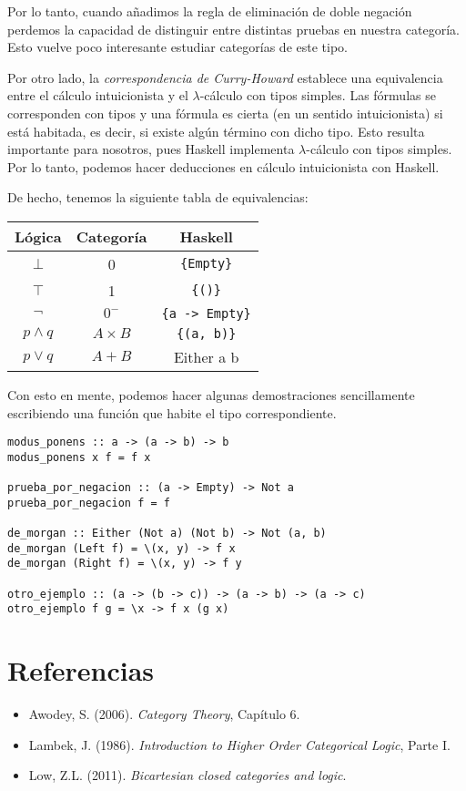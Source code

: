 \documentclass[12pt, twoside]{book}
\newcommand{\newterm}[1]{\index{#1}\emph{#1}}
\newcommand{\code}[1]{\Verb+{#1}+}
\begin{document}
Por lo tanto, cuando añadimos la regla de eliminación de doble negación perdemos la capacidad de distinguir entre distintas pruebas en nuestra categoría.
Esto vuelve poco interesante estudiar categorías de este tipo. 

Por otro lado, la \newterm{correspondencia de Curry-Howard} establece una equivalencia entre el cálculo intuicionista y el $\lambda$-cálculo con tipos simples.
Las fórmulas se corresponden con tipos y una fórmula es cierta (en un sentido intuicionista) si está habitada, es decir, si existe algún término con dicho tipo.
Esto resulta importante para nosotros, pues Haskell implementa $\lambda$-cálculo con tipos simples.
Por lo tanto, podemos hacer deducciones en cálculo intuicionista con Haskell.

De hecho, tenemos la siguiente tabla de equivalencias:
\begin{center}
\begin{tabular}{ c | c | c }
  Lógica & Categoría & Haskell\\
  \hline
  $\bot$ & 0 & \code{Empty} \\
  $\top$ & 1 & \code{()} \\
  $\neg$ & $0^{-}$ & \code{a -> Empty} \\
  $p \land q$ & $A \times B$ & \code{(a, b)} \\
  $p \lor q$ & $A + B$ & Either a b \\
\end{tabular}
\end{center}

Con esto en mente, podemos hacer algunas demostraciones sencillamente escribiendo una función que habite el tipo correspondiente.
\begin{verbatim}
modus_ponens :: a -> (a -> b) -> b
modus_ponens x f = f x

prueba_por_negacion :: (a -> Empty) -> Not a
prueba_por_negacion f = f

de_morgan :: Either (Not a) (Not b) -> Not (a, b)
de_morgan (Left f) = \(x, y) -> f x
de_morgan (Right f) = \(x, y) -> f y

otro_ejemplo :: (a -> (b -> c)) -> (a -> b) -> (a -> c)
otro_ejemplo f g = \x -> f x (g x)
\end{verbatim}

\section{Referencias}
\begin{itemize}
  \item Awodey, S. (2006). \emph{Category Theory}, Capítulo 6.
  \item Lambek, J. (1986). \emph{Introduction to Higher Order Categorical Logic}, Parte I.
  \item Low, Z.L. (2011). \emph{Bicartesian closed categories and logic}.
\end{itemize}
\end{document}
